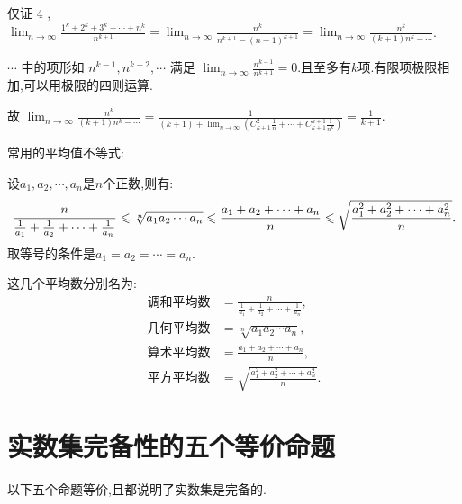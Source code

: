 \begin{solution}
    仅证 4 , $ \lim_{n \to \infty} \frac{1^k+2^k+3^k+\cdots + n^k}{n^{k+1}} = \lim_{n \to \infty} \frac{n^k}{n^{k+1}-(n-1)^{k+1}} = \lim_{n \to \infty} \frac{n^k}{(k+1)n^k - \cdots} $.

    $\cdots$ 中的项形如 $n^{k-1}, n^{k-2}, \cdots$ 满足 $ \lim_{n \to \infty} \frac{n^{k-1}}{n^{k+1}} = 0$.且至多有$k$项.有限项极限相加,可以用极限的四则运算.

    故 $ \lim_{n \to \infty} \frac{n^k}{(k+1)n^k - \cdots} = \frac{1}{(k+1) + \lim_{n \to \infty} \left( C_{k+1}^ 2 \frac{1}{n} + \cdots + C_{k+1}^{k+1} \frac{1}{n^k}\right) } = \frac{1}{k+1}$.
\end{solution}

\begin{theorem}
    常用的平均值不等式:

    设$a_1,a_2,\cdots,a_n$是$n$个正数,则有:
    $$\frac{n}{\frac{1}{a_1}+\frac{1}{a_2}+\cdots+\frac{1}{a_n}} \leqslant \sqrt[n]{a_1a_2\cdots a_n} \leqslant \frac{a_1+a_2+\cdots+a_n}{n} \leqslant \sqrt{\frac{a_1^2+a_2^2+\cdots+a_n^2}{n}}.$$
    取等号的条件是$a_1=a_2=\cdots=a_n$.
\end{theorem}

这几个平均数分别名为:
\begin{align*}
    \text{调和平均数} & = \frac{n}{\frac{1}{a_1}+\frac{1}{a_2}+\cdots+\frac{1}{a_n}}, \\
    \text{几何平均数} & = \sqrt[n]{a_1a_2\cdots a_n},                                 \\
    \text{算术平均数} & = \frac{a_1+a_2+\cdots+a_n}{n},                               \\
    \text{平方平均数} & = \sqrt{\frac{a_1^2+a_2^2+\cdots+a_n^2}{n}}.
\end{align*}

\section{实数集完备性的五个等价命题}

以下五个命题等价,且都说明了实数集是完备的.

